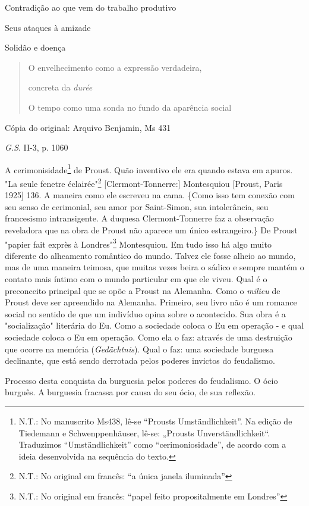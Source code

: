 Contradição ao que vem do trabalho produtivo

Seus ataques à amizade

Solidão e doença

\begin{quote}
O envelhecimento como a expressão verdadeira,

concreta da \emph{durée}

O tempo como uma sonda no fundo da aparência social
\end{quote}

Cópia do original: Arquivo Benjamin, Ms 431

\emph{G.S}. II-3, p. 1060

A cerimonisidade\footnote{N.T.: No manuscrito Ms438, lê-se ``Prousts
  Umständlichkeit''. Na edição de Tiedemann e Schwenppenhäuser, lê-se:
  „Prousts Unverständlichkeit``. Traduzimos ``Umständlichkeit'' como
  ``cerimoniosidade'', de acordo com a ideia desenvolvida na sequência
  do texto.} de Proust. Quão inventivo ele era quando estava em apuros.
"La seule fenetre éclairée"\footnote{N.T.: No original em francês: ``a
  única janela iluminada''} {[}Clermont-Tonnerre:{]} Montesquiou
{[}Proust, Paris 1925{]} 136. A maneira como ele escreveu na cama.
\{Como isso tem conexão com seu senso de cerimonial, seu amor por
Saint-Simon, sua intolerância, seu francesismo intransigente. A duquesa
Clermont-Tonnerre faz a observação reveladora que na obra de Proust não
aparece um único estrangeiro.\} De Proust "papier fait exprès à
Londres"\footnote{N.T.: No original em francês: ``papel feito
  propositalmente em Londres''} Montesquiou. Em tudo isso há algo muito
diferente do alheamento romântico do mundo. Talvez ele fosse alheio ao
mundo, mas de uma maneira teimosa, que muitas vezes beira o sádico e
sempre mantém o contato mais íntimo com o mundo particular em que ele
viveu. Qual é o preconceito principal que se opõe a Proust na Alemanha.
Como o \emph{milieu} de Proust deve ser apreendido na Alemanha.
Primeiro, seu livro não é um romance social no sentido de que um
indivíduo opina sobre o acontecido. Sua obra é a "socialização"
literária do Eu. Como a sociedade coloca o Eu em operação - e qual
sociedade coloca o Eu em operação. Como ela o faz: através de uma
destruição que ocorre na memória (\emph{Gedächtnis}). Qual o faz: uma
sociedade burguesa declinante, que está sendo derrotada pelos poderes
invictos do feudalismo.

Processo desta conquista da burguesia pelos poderes do feudalismo. O
ócio burguês. A burguesia fracassa por causa do seu ócio, de sua
reflexão.

